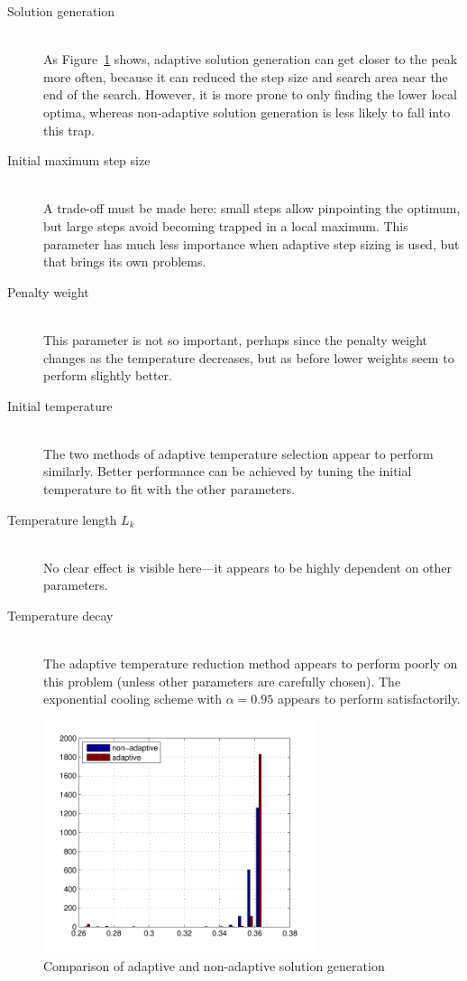 \documentclass[10pt]{article}
\begin{document}
\begin{description}
  \item[Solution generation] \hfill \\
    As Figure~\ref{fig:adaptive} shows, adaptive solution generation can get
    closer to the peak more often, because it can reduced the step size and
    search area near the end of the search. However, it is more prone to only
    finding the lower local optima, whereas non-adaptive solution generation
    is less likely to fall into this trap.
  \item[Initial maximum step size] \hfill \\
    A trade-off must be made here: small steps allow pinpointing the optimum,
    but large steps avoid becoming trapped in a local maximum. This parameter
    has much less importance when adaptive step sizing is used, but that
    brings its own problems.
  \item[Penalty weight] \hfill \\
    This parameter is not so important, perhaps since the penalty weight
    changes as the temperature decreases, but as before lower weights seem to
    perform slightly better.
  \item[Initial temperature] \hfill \\
    The two methods of adaptive temperature selection appear to perform
    similarly. Better performance can be achieved by tuning the initial
    temperature to fit with the other parameters.
  \item[Temperature length $L_k$] \hfill \\
    No clear effect is visible here---it appears to be highly dependent on
    other parameters.
  \item[Temperature decay] \hfill \\
    The adaptive temperature reduction method appears to perform poorly on
    this problem (unless other parameters are carefully chosen). The
    exponential cooling scheme \cite{kirk82} with $\alpha = 0.95$
    appears to perform satisfactorily.
    \end{description}

\begin{figure}
  \begin{center}
    \includegraphics[width=8cm]{adaptive.pdf}
    \end{center}
    \caption{Comparison of adaptive and non-adaptive solution generation}
    \label{fig:adaptive}
    \end{figure}
\end{document}
